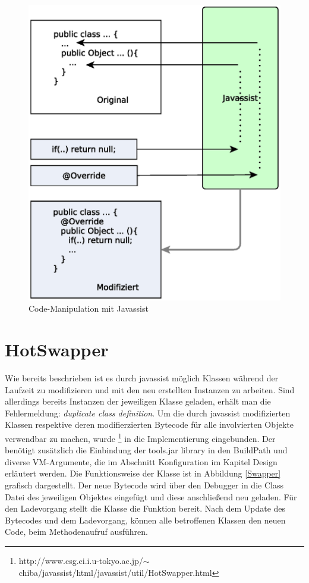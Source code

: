 \begin{figure}[!htb]
\centering
\includegraphics[scale=0.8]{graphics/javassist.eps}
 \caption[Javassist Code-Manipulation]{Code-Manipulation mit Javassist \cite{Huang:2011:SBA}}
 \label{Javassist}
\end{figure}

\section{HotSwapper}
Wie bereits beschrieben ist es durch javassist m\"oglich Klassen w\"ahrend der Laufzeit zu modifizieren und mit den neu erstellten Instanzen zu arbeiten. Sind allerdings bereits Instanzen der jeweiligen Klasse geladen, erh\"alt man die Fehlermeldung: \textit{duplicate class definition}. Um die durch javassist modifizierten Klassen respektive deren modifierzierten Bytecode f\"ur alle involvierten Objekte verwendbar zu machen, wurde \footnote{http://www.csg.ci.i.u-tokyo.ac.jp/$\sim$chiba/javassist/html/javassist/util/HotSwapper.html} in die Implementierung eingebunden. Der  ben\"otigt zus\"atzlich die Einbindung der tools.jar library in den BuildPath und diverse VM-Argumente, die im Abschnitt Konfiguration im Kapitel Design erl\"autert werden. Die Funktionsweise der Klasse  ist in Abbildung
\ref{Swapper} grafisch dargestellt. Der neue Bytecode wird \"uber den Debugger in die Class Datei des jeweiligen Objektes eingef\"ugt und diese anschlie\ss end neu geladen. F\"ur den Ladevorgang stellt die Klasse  die Funktion  bereit. Nach dem Update des Bytecodes und dem Ladevorgang, k\"onnen alle betroffenen Klassen den neuen Code, beim Methodenaufruf ausf\"uhren.

